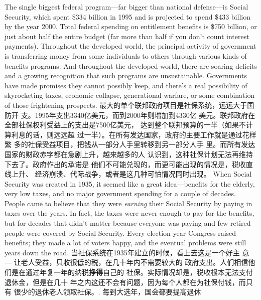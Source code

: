\begin{paracol}{2}
The single biggest federal program---far bigger than national
defense---is Social Security, which spent \$334 billion in 1995 and is projected to spend \$433 billion by the year 2000. Total
federal spending on entitlement benefits is \$750 billion, or just
about half the entire budget (far more than half if you don't
count interest payments). Throughout the developed world,
the principal activity of government is transferring money from
some individuals to others through various kinds of benefits
programs. And throughout the developed world, there are soaring deficits and a growing recognition that such programs are
unsustainable. Governments have made promises they cannot
possibly keep, and there's a real possibility of skyrocketing
taxes, economic collapse, generational warfare, or some combination of those frightening prospects.
\switchcolumn
最大的单个联邦政府项目是社保系统，远远大于国防开
支。1995年支出3340亿美元，而到2000年则增加到4330亿
美元。联邦政府在全部社保权利受益上的支出是7500亿美元，
达到整个联邦预算的一半（如果不计算利息的话，则远远超
过一半）。在所有发达国家，政府的主要工作就是通过花样繁
多的社保受益项目，把钱从一部分人手里转移到另一部分人手
里。而所有发达国家的财政赤字都在急剧上升，越来越多的人
认识到，这种社保计划无法再维持下去了。政府作出的承诺是
他们不可能兑现的，而更可能出现的情况是，税收直线上升、
经济崩溃、代际战争，或者是这几种可怕情况同时出现。
\switchcolumn*
When Social Security was created in 1935, it seemed like a
great idea---benefits for the elderly, very low taxes, and no
major government spending for a couple of decades. People
came to believe that they were \textit{earning} their Social Security by
paying in taxes over the years. In fact, the taxes were never
enough to pay for the benefits, but for decades that didn't matter because everyone was paying and few retired people were
covered by Social Security. Every election year Congress raised
benefits; they made a lot of voters happy, and the eventual
problems were still years down the road.
\switchcolumn
当社保系统在1935年建立的时候，看上去这是一个好主
意 --- 让老人受益，只收很低的税，在几十年内不需要较大的
政府支出。人们相信他们是在通过年复一年的纳税\textbf{挣得}自己的
社保。实际情况却是，税收根本无法支付退休金，但是在几十
年之内这还不会有问题，因为每个人都在为社保付钱，而只有
很少的退休老人领取社保。. 每到大选年，国会都要提高退休

\end{paracol}
